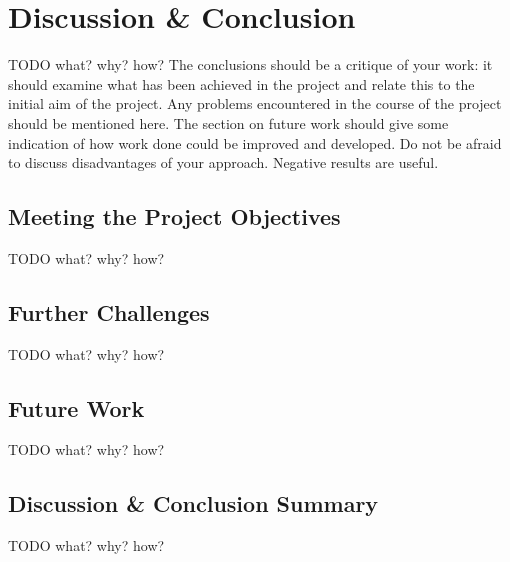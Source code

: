 
\chapter{Discussion \& Conclusion}

TODO what? why? how?
The conclusions should be a critique of your work: 
it should examine what has been achieved in the project and relate this to the initial aim of the project. 
Any problems encountered in the course of the project should be mentioned here.
The section on future work should give some indication of how work done could be improved and developed. 
Do not be afraid to discuss disadvantages of your approach. Negative results are useful.

\section{Meeting the Project Objectives}

TODO what? why? how?

\section{Further Challenges}

TODO what? why? how?

\section{Future Work}

TODO what? why? how?

\section{Discussion \& Conclusion Summary}

TODO what? why? how?